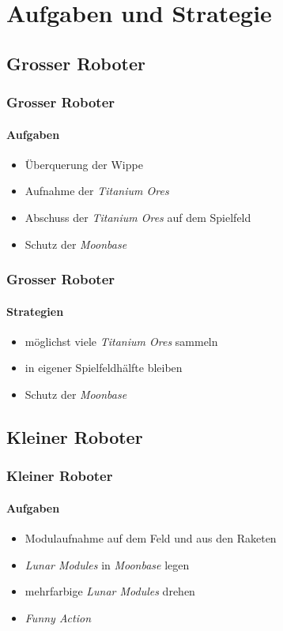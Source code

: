 \section{Aufgaben und Strategie}
\subsection{Grosser Roboter}

\begin{frame}
	\frametitle{Grosser Roboter}
	\framesubtitle{Aufgaben}
	\begin{itemize}
		\item Überquerung der Wippe
		\item Aufnahme der \textit{Titanium Ores}
		\item Abschuss der \textit{Titanium Ores} auf dem Spielfeld
		\item Schutz der \textit{Moonbase}
	\end{itemize}
\end{frame}

\begin{frame}
	\frametitle{Grosser Roboter}
	\framesubtitle{Strategien}
	\begin{itemize}
		\item möglichst viele \textit{Titanium Ores} sammeln
		\item in eigener Spielfeldhälfte bleiben
		\item Schutz der \textit{Moonbase}
	\end{itemize}
\end{frame}

\subsection{Kleiner Roboter}

\begin{frame}
	\frametitle{Kleiner Roboter}
	\framesubtitle{Aufgaben}
	\begin{itemize}
		\item Modulaufnahme auf dem Feld und aus den Raketen
		\item \textit{Lunar Modules} in \textit{Moonbase} legen
		\item mehrfarbige \textit{Lunar Modules} drehen
		\item \textit{Funny Action}
	\end{itemize}
\end{frame}

